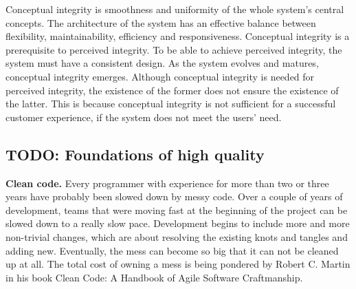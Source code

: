Conceptual integrity is smoothness and uniformity of the whole system's central concepts. The architecture of the system has an effective balance between flexibility, maintainability, efficiency and responsiveness. Conceptual integrity is a prerequisite to perceived integrity. To be able to achieve perceived integrity, the system must have a consistent design. As the system evolves and matures, conceptual integrity emerges. Although conceptual integrity is needed for perceived integrity, the existence of the former does not ensure the existence of the latter. This is because conceptual integrity is not sufficient for a successful customer experience, if the system does not meet the users' need.~\cite{poppendieck2003LSD}








% 

\subsection{TODO: Foundations of high quality}

 \textbf{Clean code.} Every programmer with experience for more than two or three years have probably been slowed down by messy code. Over a couple of years of development, teams that were moving fast at the beginning of the project can be slowed down to a really slow pace. Development begins to include more and more non-trivial changes, which are about resolving the existing knots and tangles and adding new. Eventually, the mess can become so big that it can not be cleaned up at all. The total cost of owning a mess is being pondered by Robert C. Martin in his book Clean Code: A Handbook of Agile Software Craftmanship.

